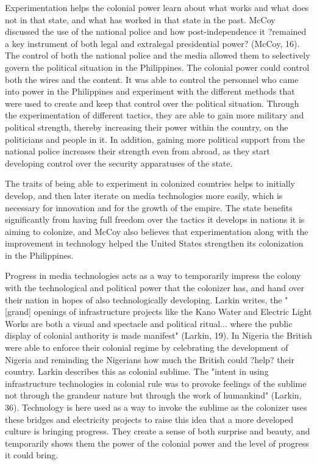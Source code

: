 \documentclass[12pt, oneside]{article}
\begin{document}
\par Experimentation helps the colonial power learn about what works and what does not in that state, and what has worked in that state in the past. McCoy discussed the use of the national police and how post-independence it ?remained a key instrument of both legal and extralegal presidential power? (McCoy, 16). The control of both the national police and the media allowed them to selectively govern the political situation in the Philippines. The colonial power could control both the wires and the content. It was able to control the personnel who came into power in the Philippines and experiment with the different methods that were used to create and keep that control over the political situation. Through the experimentation of different tactics, they are able to gain more military and political strength, thereby increasing their power within the country, on the politicians and people in it. In addition, gaining more political support from the national police increases their strength even from abroad, as they start developing control over the security apparatuses of the state.
\par The traits of being able to experiment in colonized countries helps to initially develop, and then later iterate on media technologies more easily, which is necessary for innovation and for the growth of the empire. The state benefits significantly from having full freedom over the tactics it develops in nations it is aiming to colonize, and McCoy also believes that experimentation along with the improvement in technology helped the United States strengthen its colonization in the Philippines.
\par Progress in media technologies acts as a way to temporarily impress the colony with the technological and political power that the colonizer has, and hand over their nation in hopes of also technologically developing. Larkin writes, the "[grand] openings of infrastructure projects like the Kano Water and Electric Light Works are both a visual and spectacle and political ritual... where the public display of colonial authority is made manifest" (Larkin, 19). In Nigeria the British were able to enforce their colonial regime by celebrating the development of Nigeria and reminding the Nigerians how much the British could ?help? their country. Larkin describes this as colonial sublime. The "intent in using infrastructure technologies in colonial rule was to provoke feelings of the sublime not through the grandeur nature but through the work of humankind" (Larkin, 36). Technology is here used as a way to invoke the sublime as the colonizer uses these bridges and electricity projects to raise this idea that a more developed culture is bringing progress. They create a sense of both surprise and beauty, and temporarily shows them the power of the colonial power and the level of progress it could bring.
\end{document}
